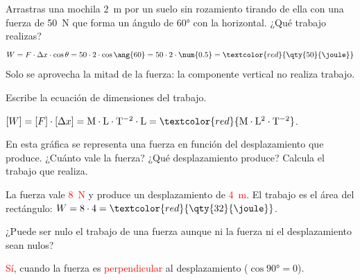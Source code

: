 \begin{example}
    Arrastras una mochila \qty{2}{\m} por un suelo sin rozamiento tirando de ella con una fuerza de \qty{50}{\newton} que forma un ángulo de \ang{60} con la horizontal. ¿Qué trabajo realizas?
    \[ W = F \cdot \Delta x \cdot \cos\theta = 50 \cdot 2 \cdot \cos\ang{60} = 50 \cdot 2 \cdot \num{0.5} = \textcolor{red}{\qty{50}{\joule}} \]
    Solo se aprovecha la mitad de la fuerza: la componente vertical no realiza trabajo.
\end{example}

\begin{exercise}
    Escribe la ecuación de dimensiones del trabajo.
    \begin{solu}
        \([W] = [F] \cdot [\Delta x] = \mathrm{M \cdot L \cdot T^{-2}} \cdot \mathrm{L} = \textcolor{red}{\mathrm{M \cdot L^2 \cdot T^{-2}}}\).
    \end{solu}
\end{exercise}

\begin{exercise}
    En esta gráfica se representa una fuerza en función del desplazamiento que produce. ¿Cuánto vale la fuerza? ¿Qué desplazamiento produce? Calcula el trabajo que realiza.
    \begin{center}
    \end{center}
    \begin{solu}
        La fuerza vale \textcolor{red}{\qty{8}{\newton}} y produce un desplazamiento de \textcolor{red}{\qty{4}{\m}}. El trabajo es el área del rectángulo: \(W = 8 \cdot 4 = \textcolor{red}{\qty{32}{\joule}}\).
    \end{solu}
\end{exercise}

\begin{exercise}
    ¿Puede ser nulo el trabajo de una fuerza aunque ni la fuerza ni el desplazamiento sean nulos?
    \begin{solu}
        \textcolor{red}{Sí}, cuando la fuerza es \textcolor{red}{perpendicular} al desplazamiento (\(\cos\ang{90} = 0\)).
    \end{solu}
\end{exercise}

